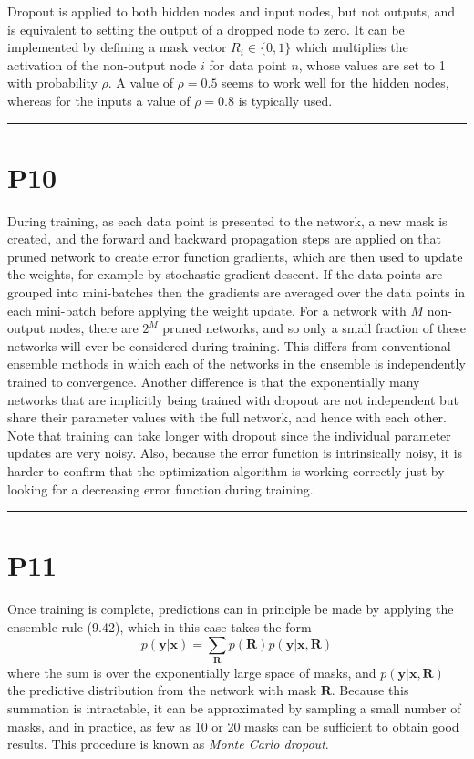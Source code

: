 \documentclass{article}
\begin{document}
Dropout is applied to both hidden nodes and input nodes, but not outputs, and is equivalent to setting the output of a dropped node to zero. It can be implemented by defining a mask vector $R_i \in \{0, 1\}$ which multiplies the activation of the non-output node $i$ for data point $n$, whose values are set to 1 with probability $\rho$. A value of $\rho = 0.5$ seems to work well for the hidden nodes, whereas for the inputs a value of $\rho = 0.8$ is typically used.

\noindent\rule{\linewidth}{0.4pt}

\section{P10}

During training, as each data point is presented to the network, a new mask is created, and the forward and backward propagation steps are applied on that pruned network to create error function gradients, which are then used to update the weights, for example by stochastic gradient descent. If the data points are grouped into mini-batches then the gradients are averaged over the data points in each mini-batch before applying the weight update. For a network with $M$ non-output nodes, there are $2^M$ pruned networks, and so only a small fraction of these networks will ever be considered during training. This differs from conventional ensemble methods in which each of the networks in the ensemble is independently trained to convergence. Another difference is that the exponentially many networks that are implicitly being trained with dropout are not independent but share their parameter values with the full network, and hence with each other. Note that training can take longer with dropout since the individual parameter updates are very noisy. Also, because the error function is intrinsically noisy, it is harder to confirm that the optimization algorithm is working correctly just by looking for a decreasing error function during training.

\noindent\rule{\linewidth}{0.4pt}

\section{P11}

Once training is complete, predictions can in principle be made by applying the ensemble rule (9.42), which in this case takes the form
\begin{equation}
p(\mathbf{y}|\mathbf{x}) = \sum_{\mathbf{R}} p(\mathbf{R}) p(\mathbf{y}|\mathbf{x}, \mathbf{R})
\tag{9.51}
\end{equation}
where the sum is over the exponentially large space of masks, and $p(\mathbf{y}|\mathbf{x}, \mathbf{R})$ the predictive distribution from the network with mask $\mathbf{R}$. Because this summation is intractable, it can be approximated by sampling a small number of masks, and in practice, as few as 10 or 20 masks can be sufficient to obtain good results. This procedure is known as \textit{Monte Carlo dropout}.
\end{document}
